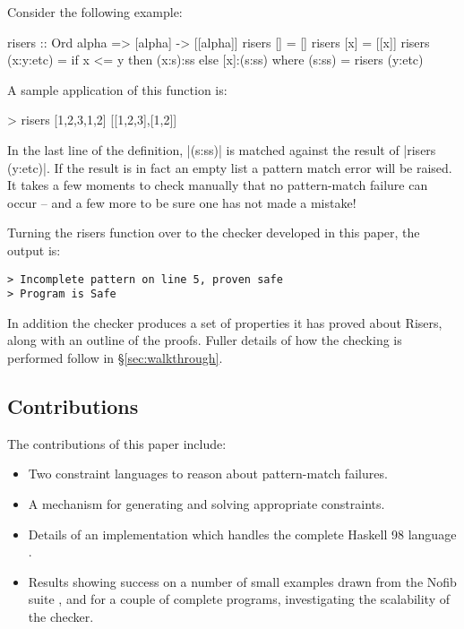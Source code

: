 \documentclass[preprint]{sigplanconf}
\newcommand{\C}[1]{\textsf{#1}}
\begin{document}
Consider the following example:

\begin{code}
risers :: Ord alpha => [alpha] -> [[alpha]]
risers [] = []
risers [x] = [[x]]
risers (x:y:etc) = if x <= y then (x:s):ss else [x]:(s:ss)
    where (s:ss) = risers (y:etc)
\end{code}

A sample application of this function is:

\begin{code}
> risers [1,2,3,1,2]
[[1,2,3],[1,2]]
\end{code}

In the last line of the definition, |(s:ss)| is matched against the result of |risers (y:etc)|. If the result is in fact an empty list a pattern match error will be raised. It takes a few moments to check manually that no pattern-match failure can occur -- and a few more to be sure one has not made a mistake!

Turning the \C{risers} function over to the checker developed in this paper, the output is:

\begin{verbatim}
> Incomplete pattern on line 5, proven safe
> Program is Safe
\end{verbatim}

In addition the checker produces a set of properties it has proved about Risers, along with an outline of the proofs. Fuller details of how the checking is performed follow in \S\ref{sec:walkthrough}.

\subsection{Contributions}

The contributions of this paper include:

\begin{itemize}
\item Two constraint languages to reason about pattern-match failures.
\item A mechanism for generating and solving appropriate constraints.
\item Details of an implementation which handles the complete Haskell 98 language \citep{haskell}.
\item Results showing success on a number of small examples drawn from the Nofib suite \citep{nofib}, and for a couple of complete programs, investigating the scalability of the checker.
\end{itemize}
\end{document}
